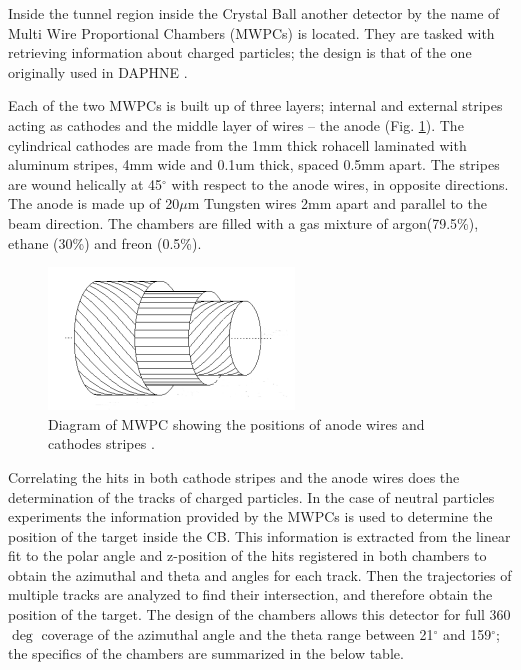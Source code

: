\indent Inside the tunnel region inside the Crystal Ball another detector by the name of Multi Wire Proportional Chambers (MWPCs) is located. They are tasked with retrieving  information  about  charged particles;  the  design  is that  of  the  one originally used in DAPHNE \cite{audit}.

\indent Each of the two MWPCs is built up of three layers; internal and external stripes acting as cathodes and the middle layer of wires – the anode (Fig. \ref{mwpc}). The cylindrical  cathodes  are  made  from  the  1mm  thick  rohacell  laminated  with aluminum stripes, 4mm wide and  0.1um thick, spaced 0.5mm apart. The stripes are  wound  helically  at  45$^{\circ}$  with  respect  to  the  anode  wires,  in  opposite directions.  The  anode  is  made  up  of  20$\mu$m  Tungsten  wires  2mm  apart  and parallel to the beam direction. The chambers are filled with a gas mixture of argon(79.5\%), ethane (30\%) and freon (0.5\%).

\begin{figure}[H]
\begin{center}
\includegraphics[scale=1.0]{mwpc.png}
\caption{Diagram of MWPC showing the positions of anode wires and cathodes stripes \cite{jalbert}.}
\label{mwpc}
\end{center}
\end{figure}


\indent Correlating  the  hits  in  both  cathode  stripes  and  the  anode  wires  does  the determination of the tracks of charged particles. In the case of neutral particles experiments the information provided by the MWPCs is used to determine the position of the target inside the CB. This information is extracted from the linear fit to the polar angle and z-position of the hits registered in both chambers to obtain the azimuthal and theta and angles for each track. Then the trajectories of multiple tracks are analyzed to find their intersection, and therefore obtain the position of the target. The design of the chambers allows this detector for full 360$\deg$ coverage of the azimuthal angle and the theta range between 21$^{\circ}$ and 159$^{\circ}$; the specifics of the chambers are summarized in the below table.

